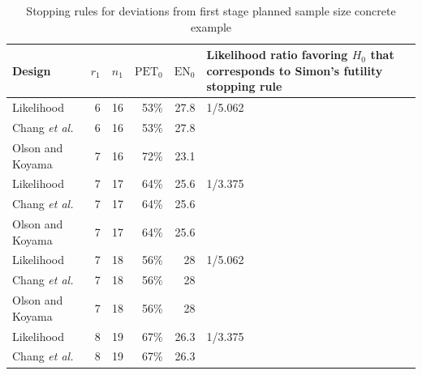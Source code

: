 \documentclass[12pt]{report}\usepackage[]{graphicx}\usepackage[]{color}
\newlength{\li}\setlength{\li}{14.48pt}
\begin{document}
\begin{table}[]
\centering
\caption{Stopping rules for deviations from first stage planned sample size concrete example}
\hspace*{-3.5cm}
\begin{tabular}{|L|R|R|R|R|L|}
\hline
Design           & $r_1$ & $n_1$ & $\mbox{PET}_0$ & $\mbox{EN}_0$ & Likelihood ratio favoring $H_0$ that corresponds to Simon's futility stopping rule \\ \hline
Likelihood       & 6     & 16    & 53\%           & 27.8          & 1/5.062                                                                            \\ \hline
Chang \textit{et al.}           & 6     & 16    & 53\%           & 27.8          &                                                                                    \\ \hline
Olson and Koyama & 7     & 16    & 72\%           & 23.1          &                                                                                    \\ \hline
Likelihood       & 7     & 17    & 64\%           & 25.6          & 1/3.375                                                                            \\ \hline
Chang \textit{et al.}           & 7     & 17    & 64\%           & 25.6          &                                                                                    \\ \hline
Olson and Koyama & 7     & 17    & 64\%           & 25.6          &                                                                                    \\ \hline
Likelihood       & 7     & 18    & 56\%           & 28            & 1/5.062                                                                            \\ \hline
Chang \textit{et al.}           & 7     & 18    & 56\%           & 28            &                                                                                    \\ \hline
Olson and Koyama & 7     & 18    & 56\%           & 28            &                                                                                    \\ \hline
Likelihood       & 8     & 19    & 67\%           & 26.3          & 1/3.375                                                                            \\ \hline
Chang \textit{et al.}           & 8     & 19    & 67\%           & 26.3          &                                                                                    \\ \hline

\end{tabular}
\end{table}
\end{document}
